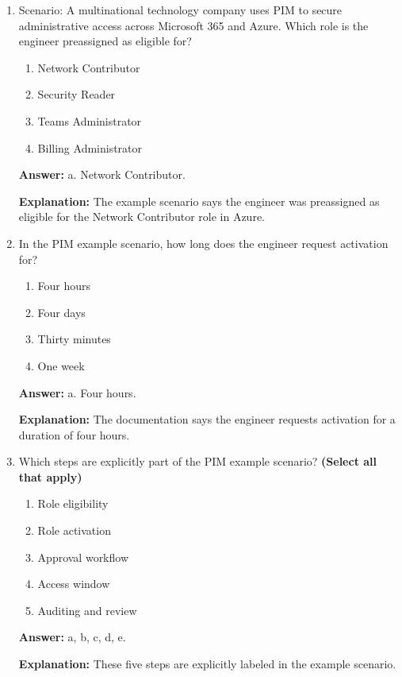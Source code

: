 \documentclass[10pt]{article}
\begin{document}
\begin{enumerate}[leftmargin=*]
\item Scenario: A multinational technology company uses PIM to secure administrative access across Microsoft 365 and Azure. Which role is the engineer preassigned as eligible for?
\begin{enumerate}[label=\alph*., leftmargin=1.5em]
\item Network Contributor
\item Security Reader
\item Teams Administrator
\item Billing Administrator
\end{enumerate}
\textbf{Answer:} a. Network Contributor.

\textbf{Explanation:} The example scenario says the engineer was preassigned as eligible for the Network Contributor role in Azure.

\item In the PIM example scenario, how long does the engineer request activation for?
\begin{enumerate}[label=\alph*., leftmargin=1.5em]
\item Four hours
\item Four days
\item Thirty minutes
\item One week
\end{enumerate}
\textbf{Answer:} a. Four hours.

\textbf{Explanation:} The documentation says the engineer requests activation for a duration of four hours.

\item Which steps are explicitly part of the PIM example scenario? \textbf{(Select all that apply)}
\begin{enumerate}[label=\alph*., leftmargin=1.5em]
\item Role eligibility
\item Role activation
\item Approval workflow
\item Access window
\item Auditing and review
\end{enumerate}
\textbf{Answer:} a, b, c, d, e.

\textbf{Explanation:} These five steps are explicitly labeled in the example scenario.


\end{enumerate}
\end{document}
